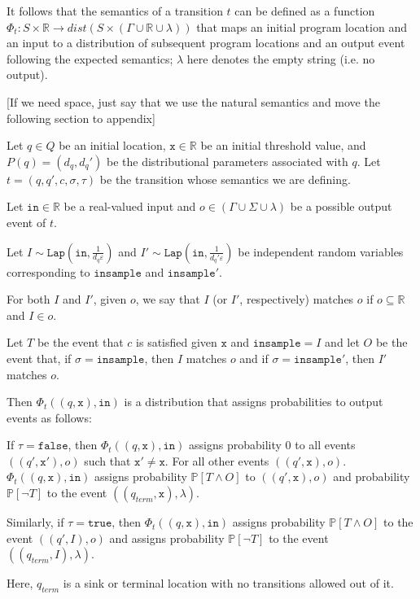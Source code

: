 \documentclass[12pt]{article}
\newcommand{\RR}{\mathbb{R}}
\newcommand{\PP}{\mathbb{P}}
\newcommand{\Lap}{\texttt{Lap}}
\theoremstyle{definition}
\begin{document}
It follows that the semantics of a transition $t$ can be defined as a function $\Phi_t: S\times \RR\to dist(S\times (\Gamma\cup\RR\cup \lambda))$ that maps an initial program location and an input to a distribution of subsequent program locations and an output event following the expected semantics; $\lambda$ here denotes the empty string (i.e. no output). 

{\color{red}[If we need space, just say that we use the natural semantics and move the following section to appendix]}

Let $q\in Q$ be an initial location, $\texttt{x}\in \RR$ be an initial threshold value, and $P(q) = (d_q, d_q')$ be the distributional parameters associated with $q$. Let $t = (q, q', c, \sigma, \tau)$ be the transition whose semantics we are defining. 

Let $\texttt{in}\in \RR$ be a real-valued input and $o\in (\Gamma\cup\Sigma\cup\lambda)$ be a possible output event of $t$.

Let $I\sim \Lap(\texttt{in}, \frac{1}{d_q\varepsilon})$ and $I'\sim \Lap(\texttt{in}, \frac{1}{d_q'\varepsilon})$ be independent random variables corresponding to $\texttt{insample}$ and $\texttt{insample}'$. 

For both $I$ and $I'$, given $o$, we say that $I$ (or $I'$, respectively) matches $o$ if $o\subseteq \RR$ and $I\in o$. 

Let $T$ be the event that $c$ is satisfied given $\texttt{x}$ and $\texttt{insample}=I$ and let $O$ be the event that, if $\sigma=\texttt{insample}$, then $I$ matches $o$ and if $\sigma = \texttt{insample}'$, then $I'$ matches $o$. 

Then $\Phi_t((q, \texttt{x}), \texttt{in})$ is a distribution that assigns probabilities to output events as follows:

If $\tau = \texttt{false}$, then $\Phi_t((q, \texttt{x}), \texttt{in})$ assigns probability 0 to all events $((q', \texttt{x}'), o)$ such that $\texttt{x}'\neq \texttt{x}$. For all other events $((q', \texttt{x}), o)$. $\Phi_t((q, \texttt{x}), \texttt{in})$ assigns probability $\PP[T\land O]$ to $((q', \texttt{x}), o)$ and probability $\PP[\lnot T]$ to the event $((q_{term}, \texttt{x}), \lambda)$.


Similarly, if $\tau = \texttt{true}$, then $\Phi_t((q, \texttt{x}), \texttt{in})$ assigns probability $\PP[T\land O] $ to the event $((q', I), o)$ and assigns probability $\PP[\lnot T]$ to the event $((q_{term}, I), \lambda)$.

Here, $q_{term}$ is a sink or terminal location with no transitions allowed out of it.
\end{document}
